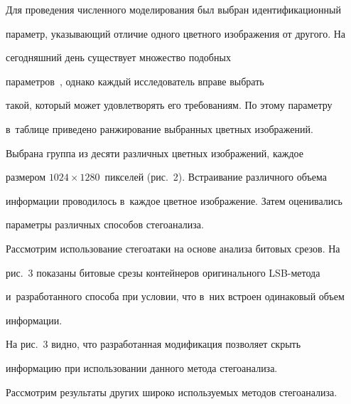   


  Для проведения численного моделирования был выбран идентификационный 


параметр, указывающий отличие одного цветного изображения от другого. На 


сегодняшний день существует множество подобных  


параметров~\cite{1-lin, 11-lin}, однако каждый исследователь вправе выбрать 


такой, который может удовлетворять его требованиям. По этому параметру 


в~таб\-ли\-це приведено ранжирование выбранных цветных изображений. 


  


 





  


  Выбрана группа из десяти различных цветных изображений, каждое 


размером $1024\times1280$~пикселей (рис.~2). Встраивание различного объема 


информации проводилось в~каждое цветное изображение. Затем оценивались 


параметры различных способов стегоанализа.


  


 


  


  Рассмотрим использование стегоатаки на основе анализа битовых срезов. На 


рис.~3 показаны битовые срезы контейнеров оригинального LSB-ме\-то\-да 


и~разработанного способа при условии, что в~них встроен одинаковый объем 


информации. 


    


    


  


  На рис.~3 видно, что разработанная модификация позволяет скрыть 


информацию при использовании данного метода стегоанализа. 


  


  Рассмотрим результаты других широко используемых методов стегоанализа.


